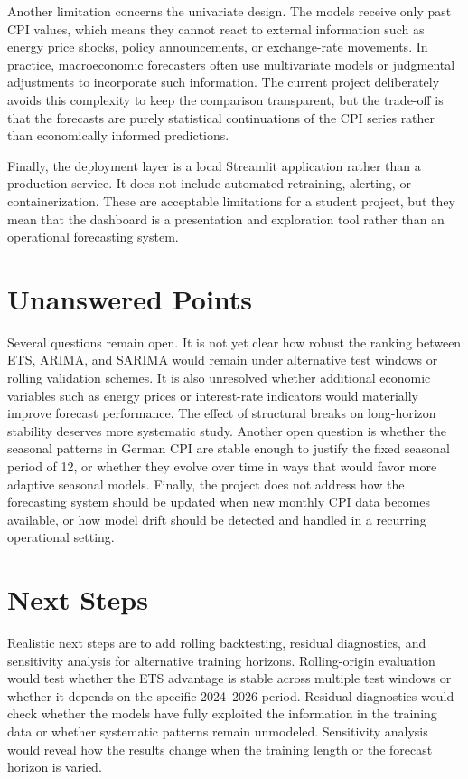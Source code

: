 Another limitation concerns the univariate design. The models receive only past CPI values, which means they cannot react to external information such as energy price shocks, policy announcements, or exchange-rate movements. In practice, macroeconomic forecasters often use multivariate models or judgmental adjustments to incorporate such information. The current project deliberately avoids this complexity to keep the comparison transparent, but the trade-off is that the forecasts are purely statistical continuations of the CPI series rather than economically informed predictions.

Finally, the deployment layer is a local Streamlit application rather than a production service. It does not include automated retraining, alerting, or containerization. These are acceptable limitations for a student project, but they mean that the dashboard is a presentation and exploration tool rather than an operational forecasting system.

\section{Unanswered Points}

Several questions remain open. It is not yet clear how robust the ranking between ETS, ARIMA, and SARIMA would remain under alternative test windows or rolling validation schemes. It is also unresolved whether additional economic variables such as energy prices or interest-rate indicators would materially improve forecast performance. The effect of structural breaks on long-horizon stability deserves more systematic study. Another open question is whether the seasonal patterns in German CPI are stable enough to justify the fixed seasonal period of 12, or whether they evolve over time in ways that would favor more adaptive seasonal models. Finally, the project does not address how the forecasting system should be updated when new monthly CPI data becomes available, or how model drift should be detected and handled in a recurring operational setting.

\section{Next Steps}

Realistic next steps are to add rolling backtesting, residual diagnostics, and sensitivity analysis for alternative training horizons. Rolling-origin evaluation would test whether the ETS advantage is stable across multiple test windows or whether it depends on the specific 2024--2026 period. Residual diagnostics would check whether the models have fully exploited the information in the training data or whether systematic patterns remain unmodeled. Sensitivity analysis would reveal how the results change when the training length or the forecast horizon is varied.

